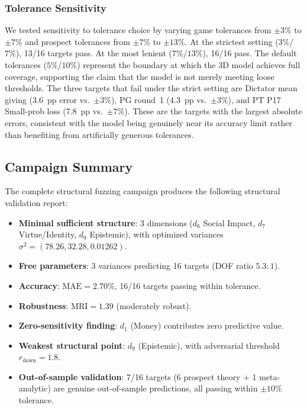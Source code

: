 \documentclass[manuscript,review,anonymous]{acmart}
\newcommand{\MAE}{\mathrm{MAE}}
\newcommand{\MRI}{\mathrm{MRI}}
\begin{document}
\subsubsection{Tolerance Sensitivity}

We tested sensitivity to tolerance choice by varying game tolerances from $\pm 3\%$ to $\pm 7\%$ and prospect tolerances from $\pm 7\%$ to $\pm 13\%$.
At the strictest setting ($3\%$/$7\%$), 13/16 targets pass.
At the most lenient ($7\%$/$13\%$), 16/16 pass.
The default tolerances ($5\%$/$10\%$) represent the boundary at which the 3D model achieves full coverage, supporting the claim that the model is not merely meeting loose thresholds.
The three targets that fail under the strict setting are Dictator mean giving (3.6~pp error vs.\ $\pm 3\%$), PG round~1 (4.3~pp vs.\ $\pm 3\%$), and PT P17 Small-prob loss (7.8~pp vs.\ $\pm 7\%$).
These are the targets with the largest absolute errors, consistent with the model being genuinely near its accuracy limit rather than benefiting from artificially generous tolerances.

\subsection{Campaign Summary}

The complete structural fuzzing campaign produces the following structural validation report:

\begin{itemize}
    \item \textbf{Minimal sufficient structure}: 3 dimensions ($d_6$ Social Impact, $d_7$ Virtue/Identity, $d_9$ Epistemic), with optimized variances $\sigma^2 = (78.26, 32.28, 0.01262)$.
    \item \textbf{Free parameters}: 3 variances predicting 16 targets (DOF ratio $5.3\!:\!1$).
    \item \textbf{Accuracy}: $\MAE = 2.70\%$, 16/16 targets passing within tolerance.
    \item \textbf{Robustness}: $\MRI = 1.39$ (moderately robust).
    \item \textbf{Zero-sensitivity finding}: $d_1$ (Money) contributes zero predictive value.
    \item \textbf{Weakest structural point}: $d_9$ (Epistemic), with adversarial threshold $r_{\mathrm{down}} = 1.8$.
    \item \textbf{Out-of-sample validation}: 7/16 targets (6 prospect theory + 1 meta-analytic) are genuine out-of-sample predictions, all passing within $\pm 10\%$ tolerance.
\end{itemize}
\end{document}
